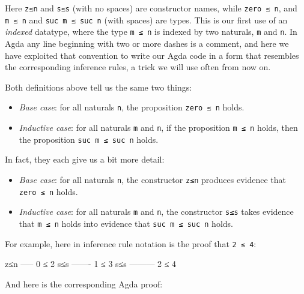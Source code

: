 Here \texttt{z≤n} and \texttt{s≤s} (with no spaces) are constructor
names, while \texttt{zero\ ≤\ n}, and \texttt{m\ ≤\ n} and
\texttt{suc\ m\ ≤\ suc\ n} (with spaces) are types. This is our first
use of an \emph{indexed} datatype, where the type \texttt{m\ ≤\ n} is
indexed by two naturals, \texttt{m} and \texttt{n}. In Agda any line
beginning with two or more dashes is a comment, and here we have
exploited that convention to write our Agda code in a form that
resembles the corresponding inference rules, a trick we will use often
from now on.

Both definitions above tell us the same two things:

\begin{itemize}
\tightlist
\item
  \emph{Base case}: for all naturals \texttt{n}, the proposition
  \texttt{zero\ ≤\ n} holds.
\item
  \emph{Inductive case}: for all naturals \texttt{m} and \texttt{n}, if
  the proposition \texttt{m\ ≤\ n} holds, then the proposition
  \texttt{suc\ m\ ≤\ suc\ n} holds.
\end{itemize}

In fact, they each give us a bit more detail:

\begin{itemize}
\tightlist
\item
  \emph{Base case}: for all naturals \texttt{n}, the constructor
  \texttt{z≤n} produces evidence that \texttt{zero\ ≤\ n} holds.
\item
  \emph{Inductive case}: for all naturals \texttt{m} and \texttt{n}, the
  constructor \texttt{s≤s} takes evidence that \texttt{m\ ≤\ n} holds
  into evidence that \texttt{suc\ m\ ≤\ suc\ n} holds.
\end{itemize}

For example, here in inference rule notation is the proof that
\texttt{2\ ≤\ 4}:

\begin{myDisplay}
  z≤n -----
      0 ≤ 2
 s≤s -------
      1 ≤ 3
s≤s ---------
      2 ≤ 4
\end{myDisplay}

And here is the corresponding Agda proof:

\begin{fence}
\begin{code}%
\>[0]\AgdaFunction{\AgdaUnderscore{}}\AgdaSpace{}%
\AgdaSymbol{:}\AgdaSpace{}%
\AgdaSpace{}%
\AgdaSpace{}%
\<%
\\
\>[0]\AgdaSymbol{\AgdaUnderscore{}}\AgdaSpace{}%
\AgdaSymbol{=}\AgdaSpace{}%
\AgdaSpace{}%
\AgdaSymbol{(}\AgdaSpace{}%
\AgdaSymbol{)}\<%
\end{code}
\end{fence}

